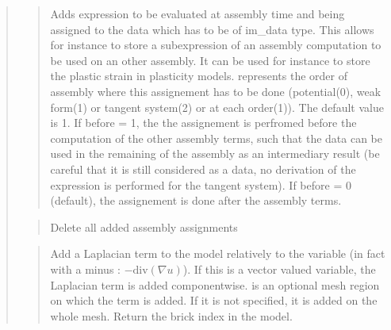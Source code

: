 \documentclass[a4paper,11pt,english]{sphinxmanual}
\begin{document}
\begin{quote}
\begin{quote}
Adds expression  to be evaluated at assembly time and being
assigned to the data  which has to be of im\_data type.
This allows for instance to store a sub\sphinxhyphen{}expression of an assembly
computation to be used on an other assembly. It can be used for instance
to store the plastic strain in plasticity models.
 represents the order of assembly where this assignement has to be
done (potential(0), weak form(1) or tangent system(2) or at each
order(\sphinxhyphen{}1)). The default value is 1.
If before = 1, the the assignement is perfromed before the computation
of the other assembly terms, such that the data can be used in the
remaining of the assembly as an intermediary result (be careful that it is
still considered as a data, no derivation of the expression is performed
for the tangent system).
If before = 0 (default), the assignement is done after the assembly terms.
\end{quote}

\begin{quote}

Delete all added assembly assignments
\end{quote}

\begin{quote}

Add a Laplacian term to the model relatively to the variable 
(in fact with a minus : \(-\text{div}(\nabla u)\)).
If this is a vector valued variable, the Laplacian term is added
componentwise.  is an optional mesh region on which the term
is added. If it is not specified, it is added on the whole mesh. Return
the brick index in the model.
\end{quote}

\begin{quote}


\end{quote}
\end{quote}
\end{document}
